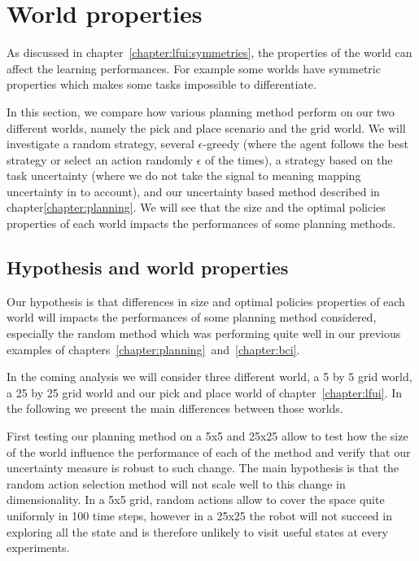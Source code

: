 
\section{World properties}
\label{chapter:limitations:wordlproperties}



As discussed in chapter~\ref{chapter:lfui:symmetries}, the properties of the world can affect the learning performances. For example some worlds have symmetric properties which makes some tasks impossible to differentiate.

In this section, we compare how various planning method perform on our two different worlds, namely the pick and place scenario and the grid world. We will investigate a random strategy, several $\epsilon$-greedy (where the agent follows the best strategy or select an action randomly $\epsilon$ of the times), a strategy based on the task uncertainty (where we do not take the signal to meaning mapping uncertainty in to account), and our uncertainty based method described in chapter\ref{chapter:planning}. We will see that the size and the optimal policies properties of each world impacts the performances of some planning methods.

\subsection{Hypothesis and world properties}

Our hypothesis is that differences in size and optimal policies properties of each world will impacts the performances of some planning method considered, especially the random method which was performing quite well in our previous examples of chapters~\ref{chapter:planning}~and~\ref{chapter:bci}.

In the coming analysis we will consider three different world, a 5 by 5 grid world, a 25 by 25 grid world and our pick and place world of chapter~\ref{chapter:lfui}. In the following we present the main differences between those worlds.

First testing our planning method on a 5x5 and 25x25 allow to test how the size of the world influence the performance of each of the method and verify that our uncertainty measure is robust to such change. The main hypothesis is that the random action selection method will not scale well to this change in dimensionality. In a 5x5 grid, random actions allow to cover the space quite uniformly in 100 time steps, however in a 25x25 the robot will not succeed in exploring all the state and is therefore unlikely to visit useful states at every experiments.

